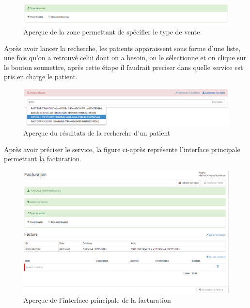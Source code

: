 \documentclass[12pt,a4paper]{report}
\begin{document}
\begin{figure}[h]
\begin{center}
\includegraphics[width=14cm]{pic/TypeVente.png}
\end{center}
\caption{Aperçue de la zone permettant de spécifier le type de vente}
\label{Aperçue de la zone permettant de spécifier le type de vente}
\end{figure}

Après avoir lancer la recherche, les patients apparaissent sous forme d'une liste, une fois qu'on a retrouvé celui dont on a besoin, on le sélectionne et on clique sur le bouton soumettre, après cette étape il faudrait preciser dans quelle service est pris en charge le patient.

\begin{figure}[h]
\begin{center}
\includegraphics[width=14cm]{pic/PatientTrouver.png}
\end{center}
\caption{Aperçue du résultats de la recherche d'un patient}
\label{Aperçue du résultats de la recherche d'un patient}
\end{figure}

\newpage
Après avoir préciser le service, la figure ci-après représente l'interface principale permettant la facturation.

\begin{figure}[h]
\begin{center}
\includegraphics[width=14cm]{pic/FacturationInterface.png}
\end{center}
\caption{Aperçue de l'interface principale de la facturation}
\label{Aperçue de l'interface principale de la facturation}
\end{figure}
\end{document}
